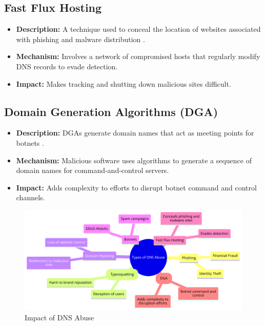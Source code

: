 \subsection{Fast Flux Hosting}
\begin{itemize}
    \item \textbf{Description:} A technique used to conceal the location of websites associated with phishing and malware distribution \cite{lin2013genetic}.
    \item \textbf{Mechanism:} Involves a network of compromised hosts that regularly modify DNS records to evade detection.
    \item \textbf{Impact:} Makes tracking and shutting down malicious sites difficult.
\end{itemize}

\subsection{Domain Generation Algorithms (DGA)}
\begin{itemize}
    \item \textbf{Description:} DGAs generate domain names that act as meeting points for botnets \cite{antonakakis2012throw}.
    \item \textbf{Mechanism:} Malicious software uses algorithms to generate a sequence of domain names for command-and-control servers.
    \item \textbf{Impact:} Adds complexity to efforts to disrupt botnet command and control channels.
\end{itemize}
\captionsetup{font= footnotesize}
\begin{figure}[H]
\centering
\includegraphics[width=1.0\textwidth]{background/DNSabuseForms.png}
\caption{Impact of DNS Abuse}
\label{fig:figureThree}
\end{figure}



